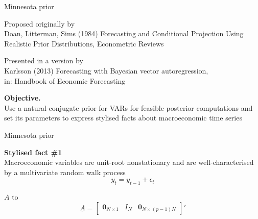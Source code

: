 \documentclass[notes,blackandwhite,mathsans,usenames,dvipsnames]{beamer}
\begin{document}
\begin{frame}{Minnesota prior}

Proposed originally by\\ \footnotesize
{\color{mcxs2}Doan, Litterman, Sims (1984) Forecasting and Conditional Projection Using Realistic Prior Distributions, Econometric Reviews}

\smallskip\normalsize Presented in a version by\\ \footnotesize
{\color{mcxs2}Karlsson (2013) Forecasting with Bayesian vector autoregression,\\ in: Handbook of Economic Forecasting}

\bigskip\normalsize\textbf{Objective.}\\
{\color{mcxs2}Use a natural-conjugate prior for VARs for feasible posterior computations and set its parameters to express stylised facts about macroeconomic time series}

\end{frame}


\begin{frame}{Minnesota prior}

\textbf{Stylised fact \#1}\\
Macroeconomic variables are unit-root nonstationary and are well-characterised by a multivariate random walk process 
$$y_t = y_{t-1}+\epsilon_t$$ 

 $A$ {\color{mcxs2}to}
$$\underline{A}=\begin{bmatrix} \mathbf{0}_{N\times1} & I_N & \mathbf{0}_{N\times(p-1)N}\end{bmatrix}'$$

\end{frame}
\end{document}
